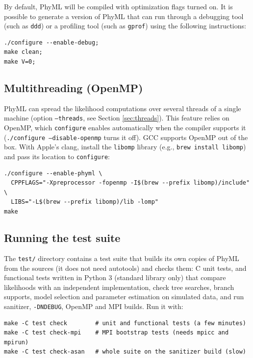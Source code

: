 \documentclass[a4paper,12pt]{article}
\newcommand{\x}[1]{\texttt{#1}}
\begin{document}
By default, PhyML will be compiled with optimization flags turned on. It is possible to generate a
version of PhyML that can run through a debugging tool (such as \x{ddd}\label{ddd}) or a profiling
tool (such as \x{gprof}\label{gprof}) using the following instructions:

{\setlength{\baselineskip}{0.5\baselineskip}
\begin{verbatim}
./configure --enable-debug;
make clean;
make V=0;
\end{verbatim}
}

\subsection{Multithreading (OpenMP)}\label{sec:install-openmp}

PhyML can spread the likelihood computations over several threads of a single machine (option
\x{--threads}, see Section \ref{sec:threads}). This feature relies on OpenMP, which \x{configure}
enables automatically when the compiler supports it (\x{./configure --disable-openmp} turns it
off). GCC supports OpenMP out of the box. With Apple's clang, install the \x{libomp} library (e.g.,
\x{brew install libomp}) and pass its location to \x{configure}:

{\setlength{\baselineskip}{0.5\baselineskip}
\begin{verbatim}
./configure --enable-phyml \
  CPPFLAGS="-Xpreprocessor -fopenmp -I$(brew --prefix libomp)/include" \
  LIBS="-L$(brew --prefix libomp)/lib -lomp"
make
\end{verbatim}
}

\subsection{Running the test suite}\label{sec:tests}

The \x{test/} directory contains a test suite that builds its own copies of PhyML from the
sources (it does not need autotools) and checks them: C unit tests, and functional tests written in
Python 3 (standard library only) that compare likelihoods with an independent implementation, check
tree searches, branch supports, model selection and parameter estimation on simulated data, and run
sanitizer, \x{-DNDEBUG}, OpenMP and MPI builds. Run it with:

{\setlength{\baselineskip}{0.5\baselineskip}
\begin{verbatim}
make -C test check        # unit and functional tests (a few minutes)
make -C test check-mpi    # MPI bootstrap tests (needs mpicc and mpirun)
make -C test check-asan   # whole suite on the sanitizer build (slow)
\end{verbatim}
}
\end{document}
